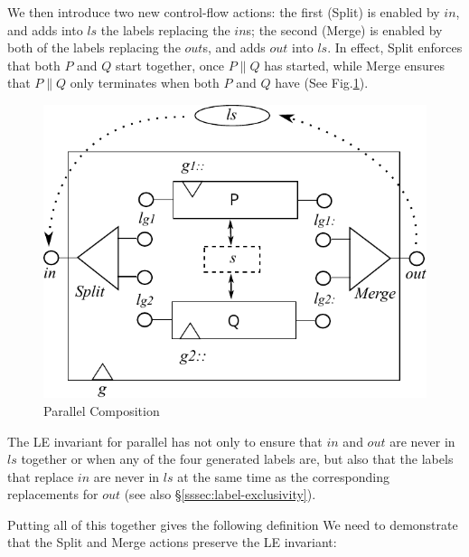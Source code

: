 We then introduce two new control-flow actions:
the first (Split) is enabled by $in$, and adds into $ls$
the labels replacing the $in$s;
the second (Merge) is enabled by both of the labels replacing the $out$s,
and adds $out$ into $ls$.
In effect, Split enforces that both $P$ and $Q$ start together,
once $P \parallel Q$ has started,
while Merge ensures that $P \parallel Q$ only terminates
when both $P$ and $Q$ have (See Fig.\ref{fig:par-comp}).
\begin{figure}
  \centering
  \includegraphics{images/par-comp-actual}
  \caption{Parallel Composition}
  \label{fig:par-comp}
\end{figure}

The LE invariant for parallel has not only to ensure
that $in$ and $out$ are never in $ls$ together
or when any of the four generated labels are,
but also that the labels that replace $in$
are never in $ls$ at the same time as the corresponding
replacements for $out$ (see also \S\ref{sssec:label-exclusivity}).

\newpage
Putting all of this together gives the following definition
We need to demonstrate that the Split and Merge actions
preserve the LE invariant:

